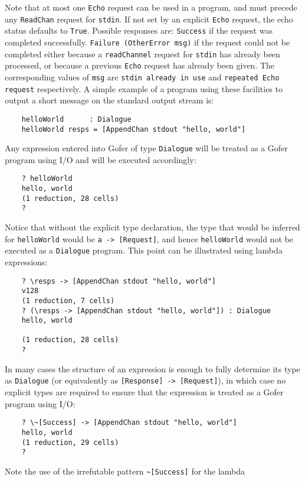      Note that at most one \verb"Echo" request can be used in a  program,  and
     must precede any \verb"ReadChan" request for \verb"stdin". 
     If  not  set  by  an
     explicit \verb"Echo" request, 
     the echo status defaults to \verb"True".  Possible
     responses are:
     \BI
     \IT  \verb"Success" if the request was completed successfully.
     \IT  \verb"Failure (OtherError msg)"  if  the  request  could  not   be
          completed either because a \verb"readChannel" request for 
          \verb"stdin" has
          already been processed, or because a  previous  \verb"Echo" request
          has already been given.  The  corresponding  values of  \verb"msg"
          are   {\tt stdin already in use}   and
          {\tt repeated Echo request}
          respectively.
     \EI
\EI
A simple example of a program using these facilities to output a short
message on the standard output stream is:
\begin{verbatim}
    helloWorld      : Dialogue
    helloWorld resps = [AppendChan stdout "hello, world"]
\end{verbatim} 
Any expression entered into Gofer of type \verb"Dialogue" will be treated as
a Gofer program using I/O and will be executed accordingly:
\begin{verbatim}
    ? helloWorld
    hello, world
    (1 reduction, 28 cells)
    ?
\end{verbatim}
Notice that without the explicit type declaration, the type that  would
be inferred for \verb"helloWorld" would  
be  \verb"a -> [Request]",  and  hence
\verb"helloWorld" would not be executed as a \verb"Dialogue" program.  This point can
be illustrated using lambda expressions:
\begin{verbatim}
    ? \resps -> [AppendChan stdout "hello, world"]
    v128
    (1 reduction, 7 cells)
    ? (\resps -> [AppendChan stdout "hello, world"]) : Dialogue
    hello, world
 
    (1 reduction, 28 cells)
    ? 
\end{verbatim}
In many cases the  structure  of  an  expression  is  enough  to  fully
determine its type  as  \verb"Dialogue" (or  equivalently  as  
\verb"[Response] -> [Request]"), 
in which case no explicit types are required to ensure that
the expression is treated as a Gofer program using I/O:
\begin{verbatim}
    ? \~[Success] -> [AppendChan stdout "hello, world"]
    hello, world
    (1 reduction, 29 cells)
    ?
\end{verbatim}
Note the use of the  irrefutable  pattern  \verb"~[Success]"  for  the  lambda
